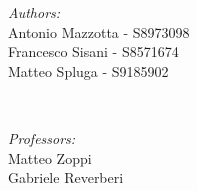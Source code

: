 \begin{titlepage}
	\begin{minipage}{0.4\textwidth}
		\begin{flushleft} \large
			\emph{Authors:}\\[0.2cm]
			Antonio Mazzotta - S8973098\\
			Francesco Sisani - S8571674\\
			Matteo Spluga - S9185902
		\end{flushleft}
	\end{minipage}
	~
	\begin{minipage}{0.4\textwidth}
		\begin{flushright} \large
			\emph{Professors:} \\[0.2cm]
			Matteo Zoppi\\ %
			Gabriele Reverberi\\[1.2em]
			
		\end{flushright}
	\end{minipage}\\[2cm]
	\makeatother
	
	
	
	
	\vfill %
	
\end{titlepage}